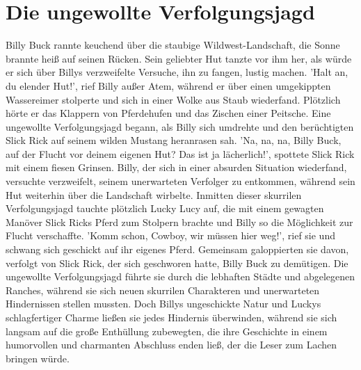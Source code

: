 \documentclass[12pt]{article} %
\begin{document}
\section{ Die ungewollte Verfolgungsjagd }
\begin{minipage}{\textwidth}
    Billy Buck rannte keuchend über die staubige Wildwest-Landschaft, die Sonne brannte heiß auf seinen Rücken. Sein geliebter Hut tanzte vor ihm her, als würde er sich über Billys verzweifelte Versuche, ihn zu fangen, lustig machen. 'Halt an, du elender Hut!', rief Billy außer Atem, während er über einen umgekippten Wassereimer stolperte und sich in einer Wolke aus Staub wiederfand. Plötzlich hörte er das Klappern von Pferdehufen und das Zischen einer Peitsche. Eine ungewollte Verfolgungsjagd begann, als Billy sich umdrehte und den berüchtigten Slick Rick auf seinem wilden Mustang heranrasen sah. 'Na, na, na, Billy Buck, auf der Flucht vor deinem eigenen Hut? Das ist ja lächerlich!', spottete Slick Rick mit einem fiesen Grinsen. Billy, der sich in einer absurden Situation wiederfand, versuchte verzweifelt, seinem unerwarteten Verfolger zu entkommen, während sein Hut weiterhin über die Landschaft wirbelte. Inmitten dieser skurrilen Verfolgungsjagd tauchte plötzlich Lucky Lucy auf, die mit einem gewagten Manöver Slick Ricks Pferd zum Stolpern brachte und Billy so die Möglichkeit zur Flucht verschaffte. 'Komm schon, Cowboy, wir müssen hier weg!', rief sie und schwang sich geschickt auf ihr eigenes Pferd. Gemeinsam galoppierten sie davon, verfolgt von Slick Rick, der sich geschworen hatte, Billy Buck zu demütigen. Die ungewollte Verfolgungsjagd führte sie durch die lebhaften Städte und abgelegenen Ranches, während sie sich neuen skurrilen Charakteren und unerwarteten Hindernissen stellen mussten. Doch Billys ungeschickte Natur und Luckys schlagfertiger Charme ließen sie jedes Hindernis überwinden, während sie sich langsam auf die große Enthüllung zubewegten, die ihre Geschichte in einem humorvollen und charmanten Abschluss enden ließ, der die Leser zum Lachen bringen würde.
\end{minipage}
\end{document}

